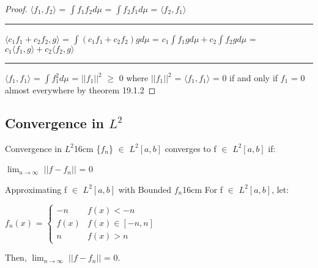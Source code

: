     \begin{proof}
        $\langle f_1,f_2 \rangle$
        = $\int f_1f_2 d\mu$
        = $\int f_2f_1 d\mu$
        = $\langle f_2,f_1 \rangle$

        \rule[0.1cm]{16.7cm}{0.01cm}

        $\langle c_1f_1 + c_2f_2 , g \rangle$
        = $\int (c_1f_1 + c_2f_2)g d\mu$
        = $c_1\int f_1g d\mu + c_2\int f_2g d\mu$
        = $c_1 \langle f_1,g \rangle + c_2 \langle f_2,g \rangle$

        \rule[0.1cm]{16.7cm}{0.01cm}

        $\langle f_1,f_1 \rangle$
        = $\int f_1^2 d\mu$
        = $||f_1||^2$ $\geq$ 0
        where $||f_1||^2$ = $\langle f_1,f_1 \rangle$ = 0
        if and only if $f_1$ = 0 almost everywhere
        by {\color{red} theorem 19.1.2}
    \end{proof}

    \newpage





\subsection{ Convergence in $L^2$ }

    \begin{definition}{Convergence in $L^2$}{16cm}
        \{$f_n$\} $\in$ $L^2[a,b]$ converges to f $\in$ $L^2[a,b]$ if:

        \hspace{0.5cm}
        $\lim_{n \rightarrow \infty}$ $||f - f_n||$ = 0
    \end{definition}

    \vspace{0.5cm}



    \begin{wtheorem}{Approximating f $\in$ $L^2[a,b]$ with Bounded $f_n$}{16cm}
        For f $\in$ $L^2[a,b]$, let:

        \hspace{0.5cm}
        $f_n(x)$ =
        $\begin{cases}
            -n & f(x) < -n \\
            f(x) & f(x) \in [-n,n] \\
            n & f(x) > n
        \end{cases}$

        Then, $\lim_{n \rightarrow \infty}$ $||f - f_n||$ = 0.
    \end{wtheorem}

